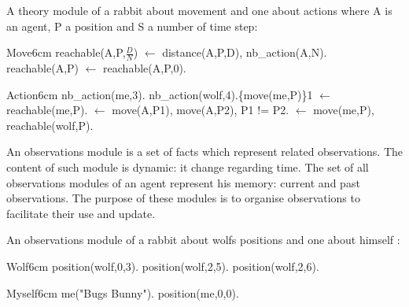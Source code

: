 \documentclass{aamas2012}
\begin{document}
	\begin{example}
		\label{theory_example}
		
		A theory module of a rabbit about movement and one about actions where A is an agent, P a position and S a number of time step:\newline
		\begin{module}{Move}{6cm}
			reachable(A,P,$\frac{D}{N}$) $\leftarrow$ distance(A,P,D), nb\_action(A,N).\newline
			reachable(A,P) $\leftarrow$ reachable(A,P,0).
		\end{module}
		
		\begin{module}{Action}{6cm}
			nb\_action(me,3).\newline
			nb\_action(wolf,4).\{move(me,P)\}1 $\leftarrow$ reachable(me,P).\newline
			$\leftarrow$ move(A,P1), move(A,P2), P1 != P2.\newline
			$\leftarrow$ move(me,P), reachable(wolf,P).
		\end{module}
		
	\end{example}

	\begin{definition}
		An observations module is a set of facts which represent related observations.
		The content of such module is dynamic: it change regarding time.
		The set of all observations modules of an agent represent his memory: current and past observations.
		The purpose of these modules is to organise observations to facilitate their use and update.
	\end{definition}
	
	\begin{example}
		An observations module of a rabbit about wolfs positions and one about himself :\newline
		\begin{module}{Wolf}{6cm}
			position(wolf,0,3).\newline
			position(wolf,2,5).\newline
			position(wolf,2,6).
		\end{module}
		
		\begin{module}{Myself}{6cm}
			me("Bugs Bunny").\newline
			position(me,0,0).
		\end{module}
	\end{example}
\end{document}
